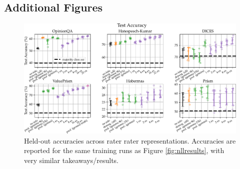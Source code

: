 \documentclass[11pt]{article}
\begin{document}
\subsection{Additional Figures}

\begin{figure}[h]
\centering
\includegraphics[width=\textwidth]{files/first_acc.pdf}
\caption{Held-out accuracies across rater rater representations. Accuracies are reported for the same training runs as Figure \ref{fig:nllresults}, with very similar takeaways/results.} 
\label{fig:accresults}
\end{figure}
\end{document}
